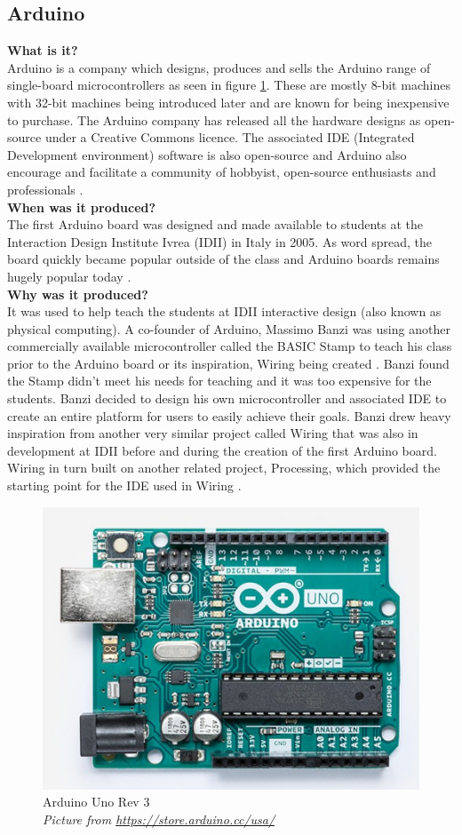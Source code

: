 \subsection{Arduino}
\textbf{What is it?}\\
Arduino is a company which designs, produces and sells the Arduino range of single-board microcontrollers as seen in figure \ref{ArduinoUno3}. These are mostly 8-bit machines with 32-bit machines being introduced later and are known for being inexpensive to purchase. The Arduino company has released all the hardware designs as open-source under a Creative Commons licence. The associated IDE (Integrated Development environment) software is also open-source and Arduino also encourage and facilitate a community of hobbyist, open-source enthusiasts and professionals 
\cite{RN133}. \\

\textbf{When was it produced?}\\
The first Arduino board was designed and made available to students at the Interaction Design Institute Ivrea (IDII) in Italy in 2005. As word spread, the board quickly became popular outside of the class and Arduino boards remains hugely popular today 
\cite{RN103}.\\

\textbf{Why was it produced?}\\
It was used to help teach the students at IDII interactive design (also known as physical computing). A co-founder of Arduino, Massimo Banzi was using another commercially available microcontroller called the BASIC Stamp to teach his class prior to the Arduino board or its inspiration, Wiring being created 
\cite{RN103}. Banzi found the Stamp didn't meet his needs for teaching and it was too expensive for the students. Banzi decided to design his own microcontroller and associated IDE to create an entire platform for users to easily achieve their goals. Banzi drew heavy inspiration from another very similar project called Wiring that was also in development at IDII before and during the creation of the first Arduino board. Wiring in turn built on another related project, Processing, which provided the starting point for the IDE used in Wiring 
\cite{RN110}\cite{RN135} \cite{RN111}. \\

\begin{figure} \begin{center}
\includegraphics[width=.3\linewidth]{pics/Arduino_uno_3} 
\end{center} 
\caption{Arduino Uno Rev 3\\ \textit{\small{Picture from \url{https://store.arduino.cc/usa/}}}}
\label{ArduinoUno3}
\end{figure} 

